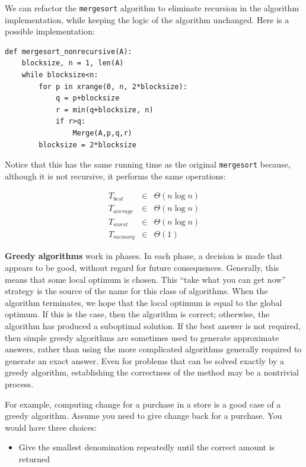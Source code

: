 \documentclass[justified,sixbynine]{tufte-book}
\def\ft{\small\tt}
\theoremstyle{plain}%
\theoremstyle{definition}
\theoremstyle{remark}
\begin{document}
\begin{fullwidth}
We can refactor the {\ft mergesort} algorithm to eliminate recursion in the algorithm implementation, while keeping the logic of the algorithm unchanged. Here is a possible implementation:
\begin{lstlisting}
def mergesort_nonrecursive(A):
    blocksize, n = 1, len(A)
    while blocksize<n:
        for p in xrange(0, n, 2*blocksize):
            q = p+blocksize
            r = min(q+blocksize, n)
            if r>q:
                Merge(A,p,q,r)
        blocksize = 2*blocksize
\end{lstlisting}

Notice that this has the same running time as the original {\ft mergesort} because, although it is not recursive, it performs the same operations:

\begin{eqnarray}
T_{best} &\in &\Theta (n\log n) \\
T_{average} &\in &\Theta (n\log n) \\
T_{worst} &\in &\Theta (n\log n) \\
T_{memory} &\in &\Theta (1)
\end{eqnarray}


{\bf Greedy algorithms}
 work in phases. In each phase, a decision is made
that appears to be good, without regard for future consequences. Generally,
this means that some local optimum is chosen. This ``take what you can get
now'' strategy is the source of the name for this class of algorithms. When
the algorithm terminates, we hope that the local optimum is equal to the
global optimum. If this is the case, then the algorithm is correct;
otherwise, the algorithm has produced a suboptimal solution. If the best
answer is not required, then simple greedy algorithms are sometimes used to
generate approximate answers, rather than using the more complicated
algorithms generally required to generate an exact answer. Even for problems
that can be solved exactly by a greedy algorithm, establishing the
correctness of the method may be a nontrivial process.

For example, computing change for a purchase in a store is a good case of a greedy algorithm.  Assume you need to give change back for a purchase.  You would have three choices:
\begin{itemize}
\item Give the smallest denomination repeatedly until the correct amount is returned


\end{itemize}
\end{fullwidth}
\end{document}
